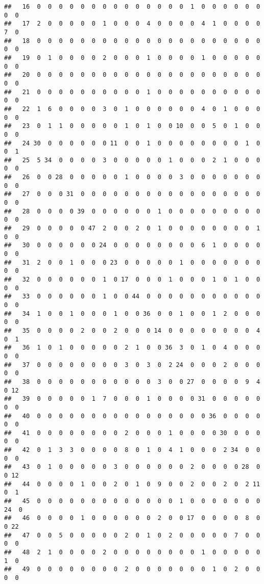 \documentclass[]{article}
\begin{document}
\begin{verbatim}
##   16  0  0  0  0  0  0  0  0  0  0  0  0  0  0  1  0  0  0  0  0  0  0  0
##   17  2  0  0  0  0  0  1  0  0  0  4  0  0  0  0  4  1  0  0  0  0  7  0
##   18  0  0  0  0  0  0  0  0  0  0  0  0  0  0  0  0  0  0  0  0  0  0  0
##   19  0  1  0  0  0  0  2  0  0  0  1  0  0  0  0  1  0  0  0  0  0  0  0
##   20  0  0  0  0  0  0  0  0  0  0  0  0  0  0  0  0  0  0  0  0  0  0  0
##   21  0  0  0  0  0  0  0  0  0  0  1  0  0  0  0  0  0  0  0  0  0  0  0
##   22  1  6  0  0  0  0  3  0  1  0  0  0  0  0  0  4  0  1  0  0  0  0  0
##   23  0  1  1  0  0  0  0  0  1  0  1  0  0 10  0  0  5  0  1  0  0  0  0
##   24 30  0  0  0  0  0  0 11  0  0  1  0  0  0  0  0  0  0  0  1  0  0  1
##   25  5 34  0  0  0  0  3  0  0  0  0  0  1  0  0  0  2  1  0  0  0  0  0
##   26  0  0 28  0  0  0  0  0  1  0  0  0  0  3  0  0  0  0  0  0  0  0  0
##   27  0  0  0 31  0  0  0  0  0  0  0  0  0  0  0  0  0  0  0  0  0  0  0
##   28  0  0  0  0 39  0  0  0  0  0  0  1  0  0  0  0  0  0  0  0  0  0  0
##   29  0  0  0  0  0 47  2  0  0  2  0  1  0  0  0  0  0  0  0  0  1  0  0
##   30  0  0  0  0  0  0 24  0  0  0  0  0  0  0  0  6  1  0  0  0  0  0  0
##   31  2  0  0  1  0  0  0 23  0  0  0  0  0  1  0  0  0  0  0  0  0  0  0
##   32  0  0  0  0  0  0  1  0 17  0  0  0  1  0  0  0  1  0  1  0  0  0  0
##   33  0  0  0  0  0  0  1  0  0 44  0  0  0  0  0  0  0  0  0  0  0  0  0
##   34  1  0  0  1  0  0  0  1  0  0 36  0  0  1  0  0  1  2  0  0  0  0  0
##   35  0  0  0  0  2  0  0  2  0  0  0 14  0  0  0  0  0  0  0  0  4  0  1
##   36  1  0  1  0  0  0  0  0  2  1  0  0 36  3  0  1  0  4  0  0  0  0  0
##   37  0  0  0  0  0  0  0  0  3  0  3  0  2 24  0  0  0  2  0  0  0  0  0
##   38  0  0  0  0  0  0  0  0  0  0  0  3  0  0 27  0  0  0  0  9  4  0 12
##   39  0  0  0  0  0  1  7  0  0  0  1  0  0  0  0 31  0  0  0  0  0  0  0
##   40  0  0  0  0  0  0  0  0  0  0  0  0  0  0  0  0 36  0  0  0  0  0  0
##   41  0  0  0  0  0  0  0  0  2  0  0  0  1  0  0  0  0 30  0  0  0  0  0
##   42  0  1  3  3  0  0  0  0  8  0  1  0  4  1  0  0  0  2 34  0  0  0  0
##   43  0  1  0  0  0  0  0  3  0  0  0  0  0  0  2  0  0  0  0 28  0  0 12
##   44  0  0  0  0  1  0  0  2  0  1  0  9  0  0  2  0  0  2  0  2 11  0  1
##   45  0  0  0  0  0  0  0  0  0  0  0  0  0  1  0  0  0  0  0  0  0 24  0
##   46  0  0  0  0  1  0  0  0  0  0  0  2  0  0 17  0  0  0  0  8  0  0 22
##   47  0  0  5  0  0  0  0  0  2  0  1  0  2  0  0  0  0  0  7  0  0  0  0
##   48  2  1  0  0  0  0  2  0  0  0  0  0  0  0  0  1  0  0  0  0  0  1  0
##   49  0  0  0  0  0  0  0  0  2  0  0  0  0  0  0  0  1  0  2  0  0  0  0

\end{verbatim}
\end{document}
